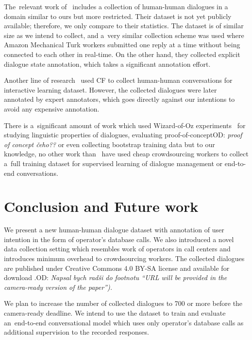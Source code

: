 \documentclass[runningheads,a4paper]{llncs}
\def\OD#1{{\color{darkgreen}OD: \it #1}}
\def\ODdel#1{\bgroup\markoverwith{\textcolor{darkgreen}{\rule[0.5ex]{2pt}{1pt}}}\ULon{#1}}
\begin{document}
The~relevant work of~\cite{wen2016network} includes a collection of human-human dialogues in a domain similar to ours but more restricted.
Their dataset is not yet publicly available; therefore, we only compare to their statistics.
The dataset is of similar size as we intend to collect, and a~very similar collection scheme was used where Amazon Mechanical Turk workers submitted one reply at a time without being connected to each other in real-time.
On the other hand, they collected explicit dialogue state annotation, which takes a significant annotation effort.

Another line of research~\cite{vodolan2016data} used CF to collect human-human conversations for interactive learning dataset.
However, the collected dialogues were later annotated by expert annotators, which goes directly against our intentions to avoid any expensive annotation.

There is a~significant amount of work which used Wizard-of-Oz experiments~\cite{whittaker2002fish,walker1997evaluating,rieser2008learning} for studying linguistic properties of dialogues, evaluating proof-of-concept\OD{proof of concept čeho??} or even collecting bootstrap training data but to our knowledge, no other work than~\cite{wen2016network} have used cheap crowdsourcing workers to collect a~full training dataset for supervised learning of dialogue management or end-to-end conversations.

\section{Conclusion and Future work} \label{sec:conc}
\vspace{-0.50em}
We present a new human-human dialogue dataset with annotation of user intention in the form of operator's database calls.
We also introduced a novel data collection setting which resembles work of operators in call centers and introduces minimum overhead to crowdsourcing workers.
The collected dialogues are published under Creative Commons 4.0 BY-SA license and available for download \ODdel{at {\it anonymized}}.\OD{Napsal bych radši do footnotu “URL will be provided in the camera-ready version of the paper”).}  %

We plan to increase the number of collected dialogues to 700 or more before the camera-ready deadline.
We intend to use the dataset to train and evaluate an~end-to-end conversational model which uses only operator's database calls as additional supervision to the recorded responses. 
\end{document}
